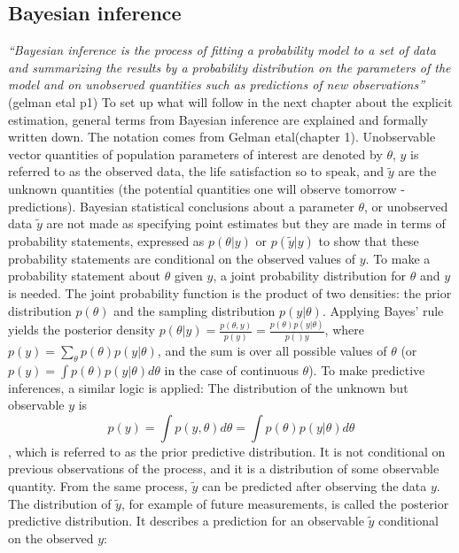 \documentclass[a4, 12pt]{article}
\begin{document}
\hypertarget{bayesian-inference}{%
\subsection{Bayesian inference}\label{bayesian-inference}}

\emph{``Bayesian inference is the process of fitting a probability model to a set of data and summarizing the results by a probability distribution on the parameters of the model and on unobserved quantities such as predictions of new observations''} (gelman etal p1)
To set up what will follow in the next chapter about the explicit estimation, general terms from Bayesian inference are explained and formally written down. The notation comes from Gelman etal(chapter 1).
Unobservable vector quantities of population parameters of interest are denoted by \(\theta\), \(y\) is referred to as the observed data, the life satisfaction so to speak, and \(\tilde{y}\) are the unknown quantities (the potential quantities one will observe tomorrow - predictions). Bayesian statistical conclusions about a parameter \(\theta\), or unobserved data \(\tilde{y}\) are not made as specifying point estimates but they are made in terms of probability statements, expressed as \(p(\theta|y)\) or \(p(\tilde y|y)\) to show that these probability statements are conditional on the observed values of \(y\).
To make a probability statement about \(\theta\) given \(y\), a joint probability distribution for \(\theta\) and \(y\) is needed. The joint probability function is the product of two densities: the prior distribution \(p(\theta)\) and the sampling distribution \(p(y|\theta)\). Applying Bayes' rule yields the posterior density \(p(\theta|y)=\frac{p(\theta,y)}{p(y)}=\frac{p(\theta)p(y|\theta)}{p()y}\),
where \(p(y)=\sum_\theta{p(\theta)p(y|\theta)}\), and the sum is over all possible values of \(\theta\) (or \(p(y)=\int p(\theta)p(y|\theta)d\theta\) in the case of continuous \(\theta\)).
To make predictive inferences, a similar logic is applied:
The distribution of the unknown but observable \(y\) is
\[p(y)=\int p(y,\theta)d\theta=\int p(\theta)p(y|\theta)d\theta\], which is referred to as the prior predictive distribution. It is not conditional on previous observations of the process, and it is a distribution of some observable quantity.
From the same process, \(\tilde{y}\) can be predicted after observing the data \(y\).
The distribution of \(\tilde{y}\), for example of future measurements, is called the posterior predictive distribution. It describes a prediction for an observable \(\tilde{y}\) conditional on the observed \(y\):
\end{document}
